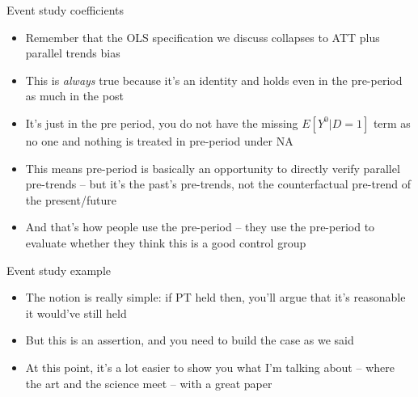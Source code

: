 \documentclass{beamer}
\begin{document}
\begin{frame}{Event study coefficients}

\begin{itemize}
\item Remember that the OLS specification we discuss collapses to ATT plus parallel trends bias
\item This is \emph{always} true because it's an identity and holds even in the pre-period as much in the post
\item It's just in the pre period, you do not have the missing $E[Y^0|D=1]$ term as no one and nothing is treated in pre-period under NA
\item This means pre-period is basically an opportunity to directly verify parallel pre-trends -- but it's the past's pre-trends, not the counterfactual pre-trend of the present/future
\item And that's how people use the pre-period -- they use the pre-period to evaluate whether they think this is a good control group
\end{itemize}

\end{frame}

\begin{frame}{Event study example}

\begin{itemize}
\item The notion is really simple: if PT held then, you'll argue that it's reasonable it would've still held
\item But this is an assertion, and you need to build the case as we said
\item At this point, it's a lot easier to show you what I'm talking about -- where the art and the science meet -- with a great paper
\end{itemize}

\end{frame}
\end{document}

